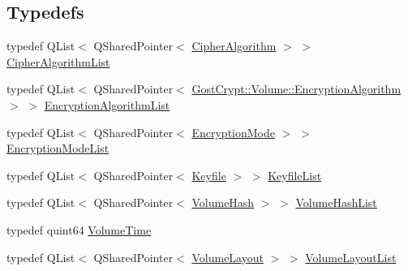 \subsection*{Typedefs}
\begin{DoxyCompactItemize}
\item 
typedef Q\+List$<$ Q\+Shared\+Pointer$<$ \hyperlink{class_gost_crypt_1_1_volume_1_1_cipher_algorithm}{Cipher\+Algorithm} $>$ $>$ \hyperlink{namespace_gost_crypt_1_1_volume_ad32c730cdf3a63d2bafbac0f63f0740f}{Cipher\+Algorithm\+List}
\item 
typedef Q\+List$<$ Q\+Shared\+Pointer$<$ \hyperlink{class_gost_crypt_1_1_volume_1_1_encryption_algorithm}{Gost\+Crypt\+::\+Volume\+::\+Encryption\+Algorithm} $>$ $>$ \hyperlink{namespace_gost_crypt_1_1_volume_ae58c307b345c639d35f6dc68af4017b5}{Encryption\+Algorithm\+List}
\item 
typedef Q\+List$<$ Q\+Shared\+Pointer$<$ \hyperlink{class_gost_crypt_1_1_volume_1_1_encryption_mode}{Encryption\+Mode} $>$ $>$ \hyperlink{namespace_gost_crypt_1_1_volume_a94b281aaee6b2ca9317cf8bf25605f79}{Encryption\+Mode\+List}
\item 
typedef Q\+List$<$ Q\+Shared\+Pointer$<$ \hyperlink{class_gost_crypt_1_1_volume_1_1_keyfile}{Keyfile} $>$ $>$ \hyperlink{namespace_gost_crypt_1_1_volume_af2dce083ae31a8d22257d609e924963d}{Keyfile\+List}
\item 
typedef Q\+List$<$ Q\+Shared\+Pointer$<$ \hyperlink{class_gost_crypt_1_1_volume_1_1_volume_hash}{Volume\+Hash} $>$ $>$ \hyperlink{namespace_gost_crypt_1_1_volume_a513257938e5ea0554ad83d0eb08f8f67}{Volume\+Hash\+List}
\item 
typedef quint64 \hyperlink{namespace_gost_crypt_1_1_volume_a4aab8aad1263f3abd1e4949b1e428468}{Volume\+Time}
\item 
typedef Q\+List$<$ Q\+Shared\+Pointer$<$ \hyperlink{class_gost_crypt_1_1_volume_1_1_volume_layout}{Volume\+Layout} $>$ $>$ \hyperlink{namespace_gost_crypt_1_1_volume_a5b9119eca7c78317a24ab85145fb9ac8}{Volume\+Layout\+List}
\end{DoxyCompactItemize}
